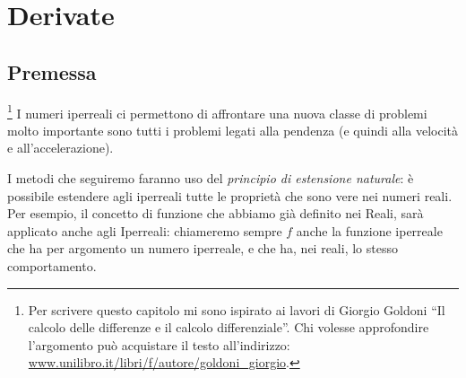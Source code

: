 


\chapter{Derivate}

% 

\section{Premessa}
\footnote{Per scrivere questo capitolo mi sono ispirato 
ai lavori di Giorgio Goldoni ``Il calcolo delle differenze e il calcolo 
differenziale''. 
Chi volesse approfondire l'argomento può acquistare il testo 
all'indirizzo: 
\href{https://www.unilibro.it/libri/f/autore/goldoni\_giorgio}
     {www.unilibro.it/libri/f/autore/goldoni\_giorgio}.}
I numeri iperreali ci permettono di affrontare una nuova classe di problemi 
molto importante sono tutti i problemi legati alla pendenza (e quindi alla 
velocità e all'accelerazione).

I metodi che seguiremo faranno uso del \emph{principio di estensione 
naturale}: è possibile estendere agli iperreali tutte le proprietà che 
sono vere nei numeri reali.
Per esempio, il concetto di funzione che abbiamo già definito nei Reali, 
sarà applicato anche agli Iperreali: chiameremo sempre \(f\) anche
la funzione iperreale che ha per argomento un numero iperreale, 
e che ha, nei reali, lo stesso comportamento.

